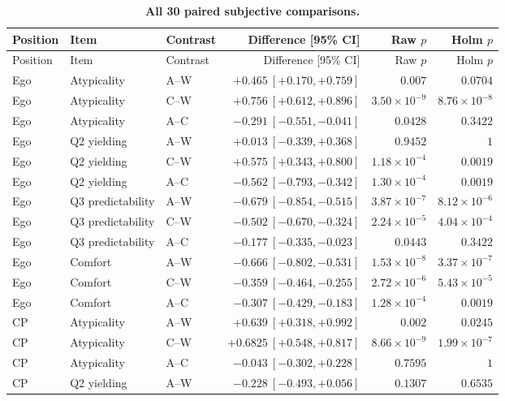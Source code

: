 \begingroup\scriptsize
\setlength{\tabcolsep}{4pt}
\renewcommand{\arraystretch}{1.1}
\begin{longtable}{lllrrr}
\caption{\textbf{All 30 paired subjective comparisons.}}\label{tab:subjective_full}\\
\toprule
Position & Item & Contrast & Difference [95\% CI] & Raw $p$ & Holm $p$ \\
\midrule
\endfirsthead
\toprule
Position & Item & Contrast & Difference [95\% CI] & Raw $p$ & Holm $p$ \\
\midrule
\endhead
\bottomrule
\endfoot
Ego & Atypicality & A--W & $+0.465\ [+0.170,+0.759]$ & $0.007$ & $0.0704$ \\
Ego & Atypicality & C--W & $+0.756\ [+0.612,+0.896]$ & $3.50\!\times\!10^{-9}$ & $8.76\!\times\!10^{-8}$ \\
Ego & Atypicality & A--C & $-0.291\ [-0.551,-0.041]$ & $0.0428$ & $0.3422$ \\
Ego & Q2 yielding & A--W & $+0.013\ [-0.339,+0.368]$ & $0.9452$ & $1$ \\
Ego & Q2 yielding & C--W & $+0.575\ [+0.343,+0.800]$ & $1.18\!\times\!10^{-4}$ & $0.0019$ \\
Ego & Q2 yielding & A--C & $-0.562\ [-0.793,-0.342]$ & $1.30\!\times\!10^{-4}$ & $0.0019$ \\
Ego & Q3 predictability & A--W & $-0.679\ [-0.854,-0.515]$ & $3.87\!\times\!10^{-7}$ & $8.12\!\times\!10^{-6}$ \\
Ego & Q3 predictability & C--W & $-0.502\ [-0.670,-0.324]$ & $2.24\!\times\!10^{-5}$ & $4.04\!\times\!10^{-4}$ \\
Ego & Q3 predictability & A--C & $-0.177\ [-0.335,-0.023]$ & $0.0443$ & $0.3422$ \\
Ego & Comfort & A--W & $-0.666\ [-0.802,-0.531]$ & $1.53\!\times\!10^{-8}$ & $3.37\!\times\!10^{-7}$ \\
Ego & Comfort & C--W & $-0.359\ [-0.464,-0.255]$ & $2.72\!\times\!10^{-6}$ & $5.43\!\times\!10^{-5}$ \\
Ego & Comfort & A--C & $-0.307\ [-0.429,-0.183]$ & $1.28\!\times\!10^{-4}$ & $0.0019$ \\
CP & Atypicality & A--W & $+0.639\ [+0.318,+0.992]$ & $0.002$ & $0.0245$ \\
CP & Atypicality & C--W & $+0.6825\ [+0.548,+0.817]$ & $8.66\!\times\!10^{-9}$ & $1.99\!\times\!10^{-7}$ \\
CP & Atypicality & A--C & $-0.043\ [-0.302,+0.228]$ & $0.7595$ & $1$ \\
CP & Q2 yielding & A--W & $-0.228\ [-0.493,+0.056]$ & $0.1307$ & $0.6535$ \\

\end{longtable}
